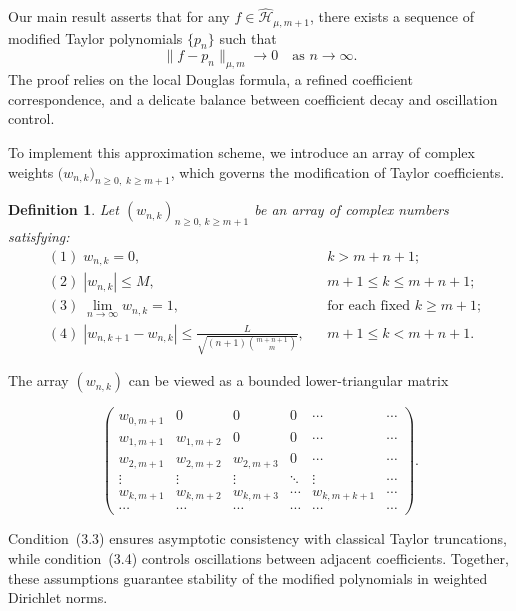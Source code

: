 \documentclass[12pt,reqno]{amsart}
\newtheorem{definition}[theorem]{Definition}
\begin{document}
Our main result asserts that for any $f \in \widehat{\mathcal{H}}_{\mu,m+1}$, there exists a sequence of modified Taylor polynomials $\{p_n\}$ such that
\[
\|f - p_n\|_{\mu,m} \longrightarrow 0 \quad \text{as } n \to \infty.
\]
The proof relies on the local Douglas formula, a refined coefficient correspondence, and a delicate balance between coefficient decay and oscillation control.

To implement this approximation scheme, we introduce an array of complex weights
$\bigl(w_{n,k}\bigr)_{n\ge0,\;k\ge m+1}$,
which governs the modification of Taylor coefficients.

\begin{definition}\label{def4.1}
Let \( (w_{n,k})_{n \ge 0,\, k \ge m+1} \) be an array of complex numbers satisfying:
\begin{align}
&(1)\; w_{n,k}=0, && k>m+n+1; \tag{3.1}\\
&(2)\; |w_{n,k}|\le M, && m+1\le k\le m+n+1; \tag{3.2}\\
&(3)\; \lim_{n\to\infty} w_{n,k}=1, && \text{for each fixed } k\ge m+1; \tag{3.3}\\
&(4)\; |w_{n,k+1}-w_{n,k}|
\le \frac{L}{\sqrt{(n+1)\binom{m+n+1}{m}}}, && m+1\le k<m+n+1. \tag{3.4}
\end{align}
\end{definition}

The array $(w_{n,k})$ can be viewed as a bounded lower-triangular matrix

\[
\begin{pmatrix}
w_{0,m+1} & 0 & 0 & 0 & \cdots & \cdots\\
w_{1,m+1} & w_{1,m+2} & 0 & 0 & \cdots & \cdots\\
w_{2,m+1} & w_{2,m+2} & w_{2,m+3} & 0 & \cdots & \cdots\\
\vdots & \vdots & \vdots & \ddots & \vdots & \cdots\\
w_{k,m+1} & w_{k,m+2} & w_{k,m+3} & \cdots & w_{k,m+k+1} & \cdots\\
\cdots & \cdots & \cdots & \cdots & \cdots &\cdots
\end{pmatrix}
.\]


Condition~(3.3) ensures asymptotic consistency with classical Taylor truncations,
while condition~(3.4) controls oscillations between adjacent coefficients.
Together, these assumptions guarantee stability of the modified polynomials in weighted Dirichlet norms.
\end{document}
